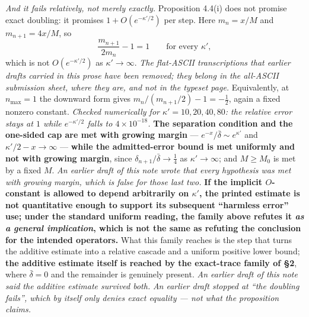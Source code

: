 \documentclass[11pt]{article}
\begin{document}
\emph{And it fails relatively, not merely exactly.} Proposition 4.4(i) does not
promise exact doubling: it promises $1+O(e^{-\kappa'/2})$ per step. Here
$m_n=x/M$ and $m_{n+1}=4x/M$, so
\[
\frac{m_{n+1}}{2m_n}-1=1
\qquad\text{for every }\kappa' ,
\]
which is not $O(e^{-\kappa'/2})$ as $\kappa'\to\infty$. \emph{The flat-ASCII
transcriptions that earlier drafts carried in this prose have been removed; they belong
in the all-ASCII submission sheet, where they are, and not in the typeset page.} Equivalently, at $n_{\max}=1$ the
downward form gives $m_n/(m_{n+1}/2)-1=-\tfrac12$, again a fixed nonzero constant.
\emph{Checked numerically for $\kappa'=10,20,40,80$: the relative error stays at
$1$ while $e^{-\kappa'/2}$ falls to $4\times10^{-18}$.} \textbf{The separation
condition and the one-sided cap are met with growing margin} --- $e^{-x}/\bar\delta\sim
e^{\kappa'}$ and $\kappa'/2-x\to\infty$ --- \textbf{while the admitted-error bound is met
uniformly and not with growing margin}, since $\delta_{n+1}/\bar\delta\to\tfrac14$
as $\kappa'\to\infty$; and $M\ge M_0$ is met by a fixed $M$. \emph{An earlier draft of
this note wrote that every hypothesis was met with growing margin, which is false for
those last two.} \textbf{If the implicit $O$-constant is allowed to depend
arbitrarily on $\kappa'$, the printed estimate is not quantitative enough to support
its subsequent ``harmless error'' use; under the standard uniform reading, the
family above refutes it \emph{as a general implication}, which is not the same as
refuting the conclusion for the intended operators.} What this family reaches is the
step that turns the additive estimate into a relative cascade and a uniform positive
lower bound; \textbf{the additive estimate itself is reached by the exact-trace family
of \S2}, where $\bar\delta=0$ and the remainder is genuinely present.
\emph{An earlier draft of this note said the additive estimate survived both.} \emph{An earlier draft stopped at ``the doubling
fails'', which by itself only denies exact equality --- not what the proposition
claims.}
\end{document}

